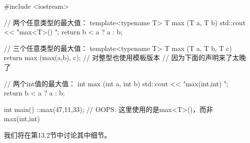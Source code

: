 \begin{cpp}
#include <iostream>

// 两个任意类型的最大值：
template<typename T>
T max (T a, T b)
{
	std::cout << "max<T>() \n";
	return b < a ? a : b;
}

// 三个任意类型的最大值：
template<typename T>
T max (T a, T b, T c)
{
	return max (max(a,b), c); // 对整型也使用模板版本
}                             // 因为下面的声明来了太晚了
                              
// 两个int值的最大值：
int max (int a, int b)
{
	std::cout << "max(int,int) \n";
	return b < a ? a : b;
}

int main()
{
	::max(47,11,33); // OOPS: 这里使用的是max<T>()，而非max(int,int)
}
\end{cpp}

我们将在第13.2节中讨论其中细节。


